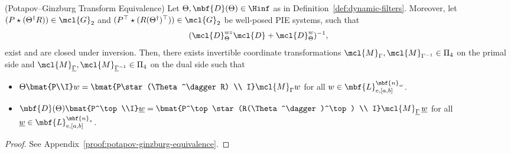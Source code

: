 \begin{lemma} (Potapov--Ginzburg Transform Equivalence)\label{lem:potapov-ginzburg-equivalence}
Let $\Theta, \mbf{D}(\Theta)\in \Hinf$ as in Definition~\ref{def:dynamic-filters}. Moreover, let $(P\star(\Theta^\dagger R))\in\mcl{G}_2$
and $(P^\top\star(R(\Theta^\dagger)^\top))\in\mcl{G}_2$ be well-posed PIE systems, such that
\[
(\mcl{D}_{\Theta}^{wz} \mcl{D} + \mcl{D}_{\Theta}^w)^{-1},
\]
exist and are closed under inversion. Then, there exists invertible coordinate transformations $\mcl{M}_{\Gamma},\mcl{M}_{\Gamma^{-1}}\in\Pi_4$ on the primal side and
$\mcl{M}_{\underline{\Gamma}},\mcl{M}_{\underline{\Gamma}^{-1}}\in\Pi_4$ on the dual side such that
\begin{itemize}
    \item $\Theta\bmat{P\\I} w = \bmat{P\star(\Theta^\dagger R) \\ I}\mcl{M}_{\Gamma} w$ for all $w\in\mbf{L}_{\mathrm{e},[a,b]}^{\mbf{n}_w}$.
    \item $\mbf{D}(\Theta)\bmat{P^\top\\I} \underline{w} = \bmat{P^\top\star(R(\Theta^\dagger)^\top) \\ I}\mcl{M}_{\underline{\Gamma}}\,\underline{w}$ for all $\underline{w}\in\mbf{L}_{\mathrm{e},[a,b]}^{\mbf{n}_z}$.
\end{itemize}
\end{lemma}
\begin{proof}
See Appendix~\ref{proof:potapov-ginzburg-equivalence}.
\end{proof}
